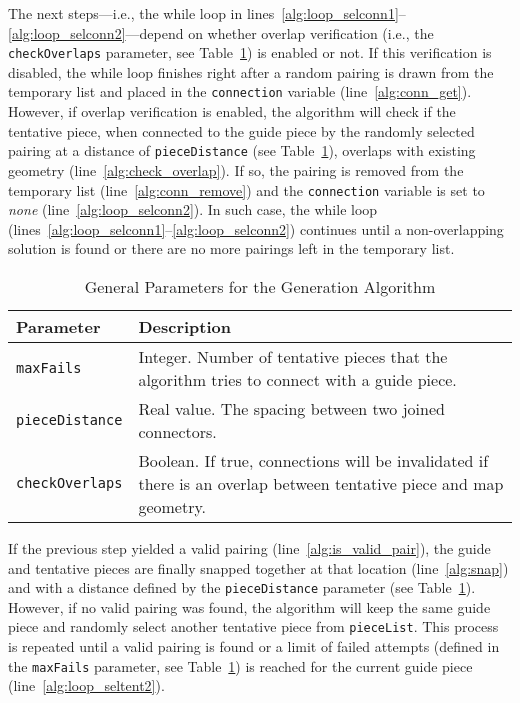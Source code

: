 \documentclass[journal]{IEEEtran}
\begin{document}
The next steps---i.e., the while loop in lines~\ref{alg:loop_selconn1}--\ref{alg:loop_selconn2}---depend
on whether overlap verification (i.e., the \texttt{checkOverlaps} parameter, see
Table~\ref{tab:generalparams}) is enabled or not. If this verification is disabled, the while
loop finishes right after a random pairing is drawn from the temporary list and placed in
the \texttt{connection} variable (line~\ref{alg:conn_get}). However, if overlap verification
is enabled, the algorithm will check if the tentative piece, when connected to the guide piece
by the randomly selected pairing at a distance of \texttt{pieceDistance} (see
Table~\ref{tab:generalparams}), overlaps with existing geometry (line~\ref{alg:check_overlap}).
If so, the pairing is removed from the temporary list (line~\ref{alg:conn_remove}) and the
\texttt{connection} variable is set to \textit{none} (line~\ref{alg:loop_selconn2}). In such
case, the while loop (lines~\ref{alg:loop_selconn1}--\ref{alg:loop_selconn2}) continues until
a non-overlapping solution is found or there are no more pairings left in the temporary list.

\begin{table}[!t]
  \caption{General Parameters for the Generation Algorithm}
  \label{tab:generalparams}
  \begin{tabular}{p{1.65cm}p{6.35cm}}
  \toprule
    Parameter & Description \\
  \midrule
    \texttt{maxFails}
    & Integer. Number of tentative pieces that the algorithm tries to connect with a guide
        piece.\\
    \texttt{pieceDistance}
    & Real value. The spacing between two joined connectors.\\
    \texttt{checkOverlaps}
    & Boolean. If true, connections will be invalidated if there is an overlap
        between tentative piece and map geometry.\\
  \bottomrule
  \end{tabular}
\end{table}

If the previous step yielded a valid pairing (line~\ref{alg:is_valid_pair}), the guide and
tentative pieces are finally snapped together at that location (line~\ref{alg:snap}) and with a
distance defined by the \texttt{pieceDistance} parameter (see Table~\ref{tab:generalparams}). However,
if no valid pairing was found, the algorithm will keep the same guide piece and randomly select
another tentative piece from \texttt{pieceList}. This process is repeated until a valid pairing
is found or a limit of failed attempts (defined in the \texttt{maxFails} parameter, see
Table~\ref{tab:generalparams}) is reached for the current guide piece (line~\ref{alg:loop_seltent2}).
\end{document}
